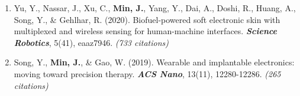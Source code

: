 \documentclass[11pt,a4paper]{article}
\begin{document}
\begin{enumerate}[leftmargin=*, itemsep=3pt, parsep=0pt, topsep=2pt]
  \item Yu, Y., Nassar, J., Xu, C., \textbf{Min, J.}, Yang, Y., Dai, A., Doshi, R., Huang, A., Song, Y., \& Gehlhar, R. (2020). Biofuel-powered soft electronic skin with multiplexed and wireless sensing for human-machine interfaces. \textbf{\textit{Science Robotics}}, 5(41), eaaz7946. \textit{(733 citations)}
  \item Song, Y., \textbf{Min, J.}, \& Gao, W. (2019). Wearable and implantable electronics: moving toward precision therapy. \textbf{\textit{ACS Nano}}, 13(11), 12280-12286. \textit{(265 citations)}
\end{enumerate}
\end{document}
